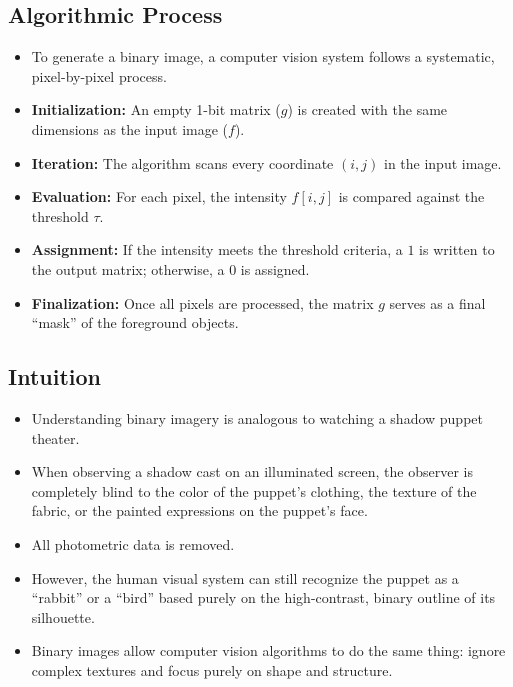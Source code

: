 \documentclass[12pt]{article}
\begin{document}
\subsection{Algorithmic Process}
\begin{itemize}
    \item To generate a binary image, a computer vision system follows a systematic, pixel-by-pixel process.

    \item \textbf{Initialization:} An empty 1-bit matrix ($g$) is created with the same dimensions as the input image ($f$).

    \item \textbf{Iteration:} The algorithm scans every coordinate $(i, j)$ in the input image.

    \item \textbf{Evaluation:} For each pixel, the intensity $f[i, j]$ is compared against the threshold $\tau$.

    \item \textbf{Assignment:} If the intensity meets the threshold criteria, a $1$ is written to the output matrix; otherwise, a $0$ is assigned.

    \item \textbf{Finalization:} Once all pixels are processed, the matrix $g$ serves as a final ``mask'' of the foreground objects.
\end{itemize}


\subsection{Intuition}
\begin{itemize}
    \item Understanding binary imagery is analogous to watching a shadow puppet theater.

    \item When observing a shadow cast on an illuminated screen, the observer is completely blind to the color of the puppet's clothing, the texture of the fabric, or the painted expressions on the puppet's face.

    \item All photometric data is removed.

    \item However, the human visual system can still recognize the puppet as a ``rabbit'' or a ``bird'' based purely on the high-contrast, binary outline of its silhouette.

    \item Binary images allow computer vision algorithms to do the same thing: ignore complex textures and focus purely on shape and structure.
\end{itemize}
\end{document}
